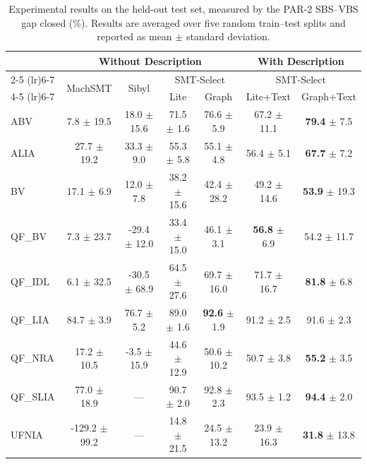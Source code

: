 \begin{table}[t]
\centering
\begin{tabular}{lcccccc}
\toprule
 & \multicolumn{4}{c}{\textbf{Without Description}} & \multicolumn{2}{c}{\textbf{With Description}} \\
\cmidrule(lr){2-5}
\cmidrule(lr){6-7}
 & \multirow{2}{*}{MachSMT} & \multirow{2}{*}{Sibyl} & \multicolumn{2}{c}{SMT-Select} & \multicolumn{2}{c}{SMT-Select} \\
\cmidrule(lr){4-5}
\cmidrule(lr){6-7}
 &  &  & Lite & Graph & Lite+Text & Graph+Text \\
\midrule
ABV & 7.8 $\pm$ 19.5 & 18.0 $\pm$ 15.6 & 71.5 $\pm$ 1.6 & 76.6 $\pm$ 5.9 & 67.2 $\pm$ 11.1 & \textbf{79.4} $\pm$ 7.5 \\
ALIA & 27.7 $\pm$ 19.2 & 33.3 $\pm$ 9.0 & 55.3 $\pm$ 5.8 & 55.1 $\pm$ 4.8 & 56.4 $\pm$ 5.1 & \textbf{67.7} $\pm$ 7.2 \\
BV & 17.1 $\pm$ 6.9 & 12.0 $\pm$ 7.8 & 38.2 $\pm$ 15.6 & 42.4 $\pm$ 28.2 & 49.2 $\pm$ 14.6 & \textbf{53.9} $\pm$ 19.3 \\
QF\_BV & 7.3 $\pm$ 23.7 & -29.4 $\pm$ 12.0 & 33.4 $\pm$ 15.0 & 46.1 $\pm$ 3.1 & \textbf{56.8} $\pm$ 6.9 & 54.2 $\pm$ 11.7 \\
QF\_IDL & 6.1 $\pm$ 32.5 & -30.5 $\pm$ 68.9 & 64.5 $\pm$ 27.6 & 69.7 $\pm$ 16.0 & 71.7 $\pm$ 16.7 & \textbf{81.8} $\pm$ 6.8 \\
QF\_LIA & 84.7 $\pm$ 3.9 & 76.7 $\pm$ 5.2 & 89.0 $\pm$ 1.6 & \textbf{92.6} $\pm$ 1.9 & 91.2 $\pm$ 2.5 & 91.6 $\pm$ 2.3 \\
QF\_NRA & 17.2 $\pm$ 10.5 & -3.5 $\pm$ 15.9 & 44.6 $\pm$ 12.9 & 50.6 $\pm$ 10.2 & 50.7 $\pm$ 3.8 & \textbf{55.2} $\pm$ 3.5 \\
QF\_SLIA & 77.0 $\pm$ 18.9 & --- & 90.7 $\pm$ 2.0 & 92.8 $\pm$ 2.3 & 93.5 $\pm$ 1.2 & \textbf{94.4} $\pm$ 2.0 \\
UFNIA & -129.2 $\pm$ 99.2 & --- & 14.8 $\pm$ 21.5 & 24.5 $\pm$ 13.2 & 23.9 $\pm$ 16.3 & \textbf{31.8} $\pm$ 13.8 \\
\bottomrule
\end{tabular}
\caption{Experimental results on the held-out test set, measured by the PAR-2 SBS–VBS gap closed (\%). Results are averaged over five random train–test splits and reported as mean $\pm$ standard deviation.}
\label{tab:final_res}
\end{table}
